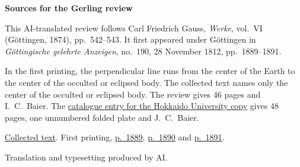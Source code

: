 \clearpage\thispagestyle{empty}
\begin{center}\textbf{Sources for the Gerling review}\end{center}
\noindent This AI-translated review follows Carl Friedrich Gauss, \textit{Werke}, vol.~VI (Göttingen, 1874), pp.~542--543. It first appeared under Göttingen in \textit{Göttingische gelehrte Anzeigen}, no.~190, 28 November 1812, pp.~1889--1891.
\par\smallskip\noindent In the first printing, the perpendicular line runs from the center of the Earth to the center of the occulted or eclipsed body. The collected text names only the center of the occulted or eclipsed body. The review gives 46 pages and I.~C.~Baier. The \href{https://ci.nii.ac.jp/ncid/BD21343055}{catalogue entry for the Hokkaido University copy} gives 48 pages, one unnumbered folded plate and J.~C.~Baier.
\par\smallskip\noindent \href{https://gdz.sub.uni-goettingen.de/id/PPN236007467}{Collected text}. First printing, \href{https://images.p.sub.uni-goettingen.de/iiif/image/gdz:PPN319721507_1812:00001933/full/1650,/0/default.jpg}{p.~1889}, \href{https://images.p.sub.uni-goettingen.de/iiif/image/gdz:PPN319721507_1812:00001934/full/1650,/0/default.jpg}{p.~1890} and \href{https://images.p.sub.uni-goettingen.de/iiif/image/gdz:PPN319721507_1812:00001935/full/1650,/0/default.jpg}{p.~1891}.
\par\smallskip\noindent Translation and typesetting produced by AI.
\clearpage
